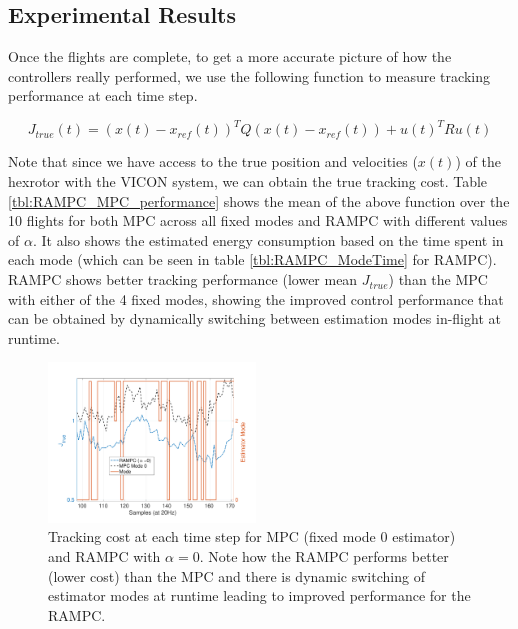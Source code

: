 \subsection{Experimental Results}

Once the flights are complete, to get a more accurate picture of how the controllers really performed, we use the following function to measure tracking performance at each time step.

\begin{equation}
	J_{true}(t) =  (x(t)-x_{ref}(t))^{T}Q(x(t)-x_{ref}(t)) + u(t)^{T}Ru(t)
\end{equation}

Note that since we have access to the true position and velocities ($x(t)$) of the hexrotor with the VICON system, we can obtain the true tracking cost. Table \ref{tbl:RAMPC_MPC_performance} shows the mean of the above function over the 10 flights for both MPC across all fixed modes and RAMPC with different values of $\alpha$. It also shows the estimated energy consumption based on the time spent in each mode (which can be seen in table \ref{tbl:RAMPC_ModeTime} for RAMPC). RAMPC shows better tracking performance (lower mean $J_{true}$) than the MPC with either of the 4 fixed modes, showing the improved control performance that can be obtained by dynamically switching between estimation modes in-flight at runtime. 

\begin{figure}[tbh]
	\centering
	\includegraphics[width=0.49\textwidth]{figures/CostAndModes}
	\caption{Tracking cost at each time step for MPC (fixed mode 0 estimator) and RAMPC with $\alpha=0$. Note how the RAMPC performs better (lower cost) than the MPC and there is dynamic switching of estimator modes at runtime leading to improved performance for the RAMPC.}	
	\label{fig:CostAndModes}
\end{figure}


